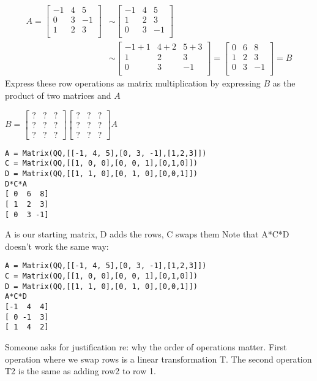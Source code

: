 \documentclass{article}
\begin{document}
\begin{align*}
A
=
\left[\begin{array}{ccc}
-1&4&5\\
0&3&-1\\
1&2&3\\
\end{array}\right]
&\sim
\left[\begin{array}{ccc}
-1&4&5\\
1&2&3\\
0&3&-1\\
\end{array}\right]\\
&\sim
\left[\begin{array}{ccc}
-1+1&4+2&5+3\\
1&2&3\\
0&3&-1\\
\end{array}\right]
=
\left[\begin{array}{ccc}
0&6&8\\
1&2&3\\
0&3&-1\\
\end{array}\right]
= 
B
\end{align*}
Express these row operations as matrix multiplication by expressing $B$ as the product of two matrices and $A$

$B = \begin{bmatrix} ? & ? & ? \\ ? & ? & ?\\ ? & ? & ? \end{bmatrix}
\begin{bmatrix} ? & ? & ? \\ ? & ? & ?\\ ? & ? & ? \end{bmatrix}  A$

\begin{verbatim}
A = Matrix(QQ,[[-1, 4, 5],[0, 3, -1],[1,2,3]])
C = Matrix(QQ,[[1, 0, 0],[0, 0, 1],[0,1,0]])
D = Matrix(QQ,[[1, 1, 0],[0, 1, 0],[0,0,1]])
D*C*A
[ 0  6  8]
[ 1  2  3]
[ 0  3 -1]
\end{verbatim}
A is our starting matrix, D adds the rows, C swaps them
Note that A*C*D doesn't work the same way:
\begin{verbatim}
A = Matrix(QQ,[[-1, 4, 5],[0, 3, -1],[1,2,3]])
C = Matrix(QQ,[[1, 0, 0],[0, 0, 1],[0,1,0]])
D = Matrix(QQ,[[1, 1, 0],[0, 1, 0],[0,0,1]])
A*C*D
[-1  4  4]
[ 0 -1  3]
[ 1  4  2]
\end{verbatim}

Someone asks for justification re: why the order of operations matter. First operation where we swap rows is a linear transformation T. The second operation T2 is the same as adding row2 to row 1. 
\end{document}

